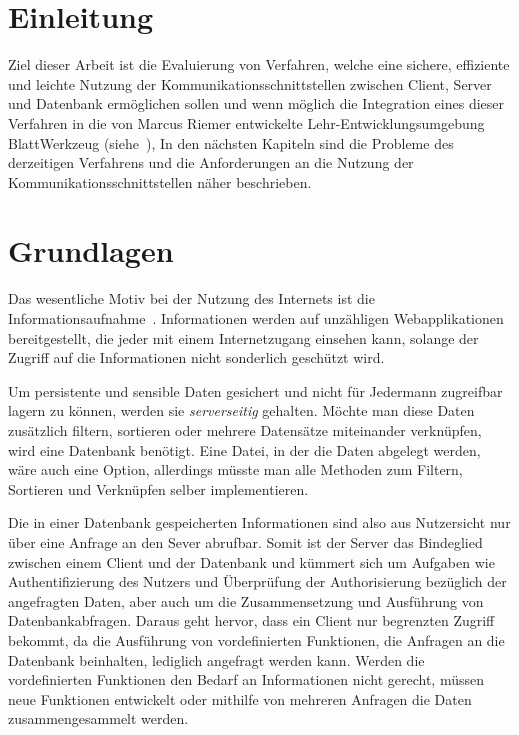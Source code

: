 
\chapter{Einleitung}
\label{sec:introduction}

Ziel dieser Arbeit ist die Evaluierung von Verfahren, welche eine sichere, effiziente und leichte Nutzung der Kommunikationsschnittstellen 
zwischen Client, Server und Datenbank ermöglichen sollen und wenn möglich die Integration eines dieser Verfahren
in die von Marcus Riemer entwickelte Lehr-Entwicklungsumgebung BlattWerkzeug (siehe~),
In den nächsten Kapiteln sind die Probleme des derzeitigen Verfahrens und die Anforderungen an die Nutzung der Kommunikationsschnittstellen näher beschrieben.

\chapter{Grundlagen}
\label{sec:basics}
Das wesentliche Motiv bei der Nutzung des Internets ist die In\-for\-ma\-tions\-auf\-nah\-me~\cite{statista-1}\cite{ard-zdf}.
Informationen werden auf unzähligen Webapplikationen bereitgestellt, die jeder mit einem Internetzugang einsehen kann,
solange der Zugriff auf die Informationen nicht sonderlich geschützt wird.

Um persistente und sensible Daten gesichert und nicht für Jedermann zugreifbar lagern zu können, werden sie \emph{serverseitig} gehalten.
Möchte man diese Daten zusätzlich filtern, sortieren oder mehrere Datensätze miteinander verknüpfen, wird eine Datenbank benötigt.
Eine Datei, in der die Daten abgelegt werden, wäre auch eine Option, allerdings müsste man alle Methoden zum Filtern, Sortieren und Verknüpfen
selber implementieren.

Die in einer Datenbank gespeicherten Informationen sind also aus Nutzersicht nur über eine Anfrage an den Sever abrufbar.
Somit ist der Server das Bindeglied zwischen einem Client und der Datenbank und kümmert sich um Aufgaben wie Authentifizierung des Nutzers
und Überprüfung der Authorisierung bezüglich der angefragten Daten, aber auch um die Zusammensetzung und Ausführung von Datenbankabfragen.
Daraus geht hervor, dass ein Client nur begrenzten Zugriff bekommt, da die Ausführung von vordefinierten Funktionen, die Anfragen an die Datenbank beinhalten,
lediglich angefragt werden kann. Werden die vordefinierten Funktionen den Bedarf an Informationen nicht gerecht, müssen neue Funktionen entwickelt
oder mithilfe von mehreren Anfragen die Daten zusammengesammelt werden.

